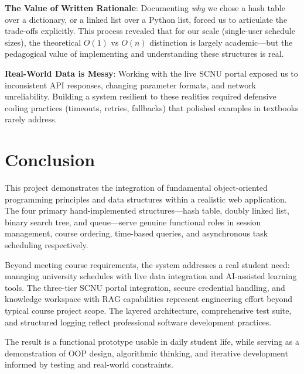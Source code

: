 \documentclass[11pt,a4paper]{article}
\begin{document}
\textbf{The Value of Written Rationale}: Documenting \textit{why} we chose a hash table over a dictionary, or a linked list over a Python list, forced us to articulate the trade-offs explicitly. This process revealed that for our scale (single-user schedule sizes), the theoretical $O(1)$ vs $O(n)$ distinction is largely academic---but the pedagogical value of implementing and understanding these structures is real.

\textbf{Real-World Data is Messy}: Working with the live SCNU portal exposed us to inconsistent API responses, changing parameter formats, and network unreliability. Building a system resilient to these realities required defensive coding practices (timeouts, retries, fallbacks) that polished examples in textbooks rarely address.

\section{Conclusion}
This project demonstrates the integration of fundamental object-oriented programming principles and data structures within a realistic web application. The four primary hand-implemented structures---hash table, doubly linked list, binary search tree, and queue---serve genuine functional roles in session management, course ordering, time-based queries, and asynchronous task scheduling respectively.

Beyond meeting course requirements, the system addresses a real student need: managing university schedules with live data integration and AI-assisted learning tools. The three-tier SCNU portal integration, secure credential handling, and knowledge workspace with RAG capabilities represent engineering effort beyond typical course project scope. The layered architecture, comprehensive test suite, and structured logging reflect professional software development practices.

The result is a functional prototype usable in daily student life, while serving as a demonstration of OOP design, algorithmic thinking, and iterative development informed by testing and real-world constraints.
\end{document}
